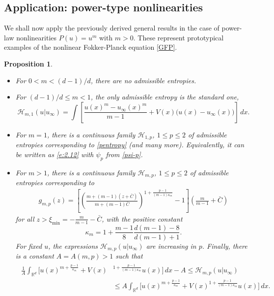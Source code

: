 \documentclass[reqno]{amsart}
\newtheorem{prop}[lemma]{Proposition}
\newcommand{\R}{\mathbb{R}}
\newcommand{\Rd}{{\R^d}}
\newcommand{\intRd}{{\int_\Rd}}
\begin{document}
%
\subsection{Application: power-type nonlinearities}\label{sct:power-laws}
%
We shall now apply the previously derived general results in the case of power-law nonlinearities $P(u)=u^m$ with $m>0$. These represent prototypical examples of the  nonlinear Fokker-Planck equation \eqref{GFP}. 
%
\begin{prop}\label{prop:genm}\
    \begin{itemize}
    \item[(a)] For $0<m<(d-1)/d$, there are no admissible entropies.
    \item[(b)] For $(d-1)/d\le m<1$, the only admissible entropy is the standard one,
        \begin{equation*}
        \mathcal H_{m,1}(u|u_\infty) = \int \left[\frac{u(x)^m-u_\infty(x)^m}{m-1}+V(x)\big(u(x)-u_\infty(x)\big)\right]\,dx. \end{equation*} 
    \item[(c)] For $m=1$, there is a continuous family $\mathcal H_{1,p}$, $1\le p\le2$ of admissible entropies corresponding to \eqref{pentropy} (and many more). Equivalently, it can be written as \eqref{e:2.12} with $\psi_p$ from \eqref{psi-p}.
    \item[(d)] For $m>1$, there is a continuous family $\mathcal H_{m,p}$, $1\le p\le2$ of admissible entropies corresponding to    
        \begin{align}\label{eq:gm}
        g_{m,p}(z) = \left[\left(\frac{m+(m-1)(z+\bar C)}{m+(m-1)\bar C} \right)^{1+\frac{p-1}{(m-1)\kappa_m}} - 1\right]\left(\frac{m}{m-1}+\bar C\right)
        \end{align}
    for all $z>\xi_{\min}=-\frac{m}{m-1}-\bar C$, with the positive constant
    \[ \kappa_m = 1+ \frac{m-1}8 \frac{d(m-1)-8}{d(m-1)+1}. \]
    For fixed $u$, the expressions $\mathcal H_{m,p}(u|u_\infty)$ are increasing in $p$. Finally, there is a  constant $A=A(m,p)>1$ such that
    \begin{align}\label{eq:orderent}
    \begin{split}
        \frac1A\intRd \Big[u(x)^{m+\frac{p-1}{\kappa_m}}+V(x)&^{1+\frac{p-1}{(m-1)\kappa_m}}u(x)\Big]\,dx-A
        \le\mathcal H_{m,p}(u|u_\infty)\\
        &\le A\intRd \Big[u(x)^{m+\frac{p-1}{\kappa_m}}+V(x)^{1+\frac{p-1}{(m-1)\kappa_m}}u(x)\Big]\,dx.
    \end{split}
    \end{align}
    \end{itemize}
\end{prop}
\end{document}

